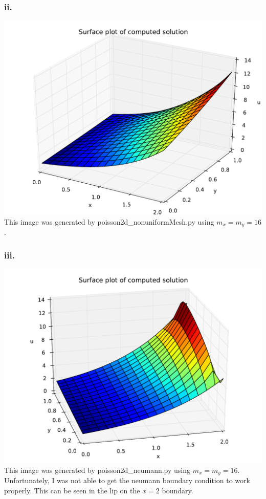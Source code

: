 \documentclass{article}
\begin{document}
\subsubsection*{ii.}
\includegraphics[width=\linewidth]{cii.pdf}
This image was generated by poisson2d\_nonuniformMesh.py using $m_x=m_y=16$.
\subsubsection*{iii.}
\includegraphics[width=\linewidth]{ciii.pdf}
This image was generated by poisson2d\_neumann.py using $m_x=m_y=16$. Unfortunately, I was not able to get the neumann boundary condition to work properly. This can be seen in the lip on the $x=2$ boundary.
\end{document}
